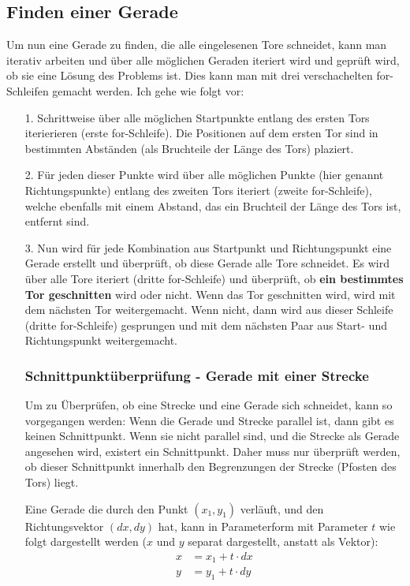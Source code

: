 \documentclass[a4paper,10pt,ngerman]{scrartcl}
\begin{document}
\subsection{Finden einer Gerade}
Um nun eine Gerade zu finden, die alle eingelesenen Tore schneidet, kann man iterativ arbeiten und über alle möglichen Geraden iteriert wird und geprüft wird, ob sie eine Lösung des Problems ist. Dies kann man mit drei verschachelten for-Schleifen gemacht werden.
Ich gehe wie folgt vor:
\begin{itemize}
  \item [1.] Schrittweise über alle möglichen Startpunkte entlang des ersten Tors iterierieren (erste for-Schleife). Die Positionen auf dem ersten Tor sind in bestimmten Abständen (als Bruchteile der Länge des Tors) plaziert.
  \item [2.] Für jeden dieser Punkte wird über alle möglichen Punkte (hier genannt Richtungspunkte) entlang des zweiten Tors iteriert (zweite for-Schleife), welche ebenfalls mit einem Abstand, das ein Bruchteil der Länge des Tors ist, entfernt sind.
  \item [3.] Nun wird für jede Kombination aus Startpunkt und Richtungspunkt eine Gerade erstellt und überprüft, ob diese Gerade alle Tore schneidet. Es wird über alle Tore iteriert (dritte for-Schleife) und überprüft, ob \textbf{ein bestimmtes Tor geschnitten} wird oder nicht.
  Wenn das Tor geschnitten wird, wird mit dem nächsten Tor weitergemacht. Wenn nicht, dann wird aus dieser Schleife (dritte for-Schleife) gesprungen und mit dem nächsten Paar aus Start- und Richtungspunkt weitergemacht.
  \newline
  \subsubsection{Schnittpunktüberprüfung - Gerade mit einer Strecke}

  Um zu Überprüfen, ob eine Strecke und eine Gerade sich schneidet, kann so vorgegangen werden: Wenn die Gerade und Strecke parallel ist, dann gibt es keinen Schnittpunkt. Wenn sie nicht parallel sind, und die Strecke als Gerade angesehen wird, existert ein Schnittpunkt.
  Daher muss nur überprüft werden, ob dieser Schnittpunkt innerhalb den Begrenzungen der Strecke (Pfosten des Tors) liegt.
  \newline 

  Eine Gerade die durch den Punkt $(x_{1}, y_{1})$ verläuft, und den Richtungsvektor $(dx, dy)$ hat, kann in Parameterform mit Parameter $t$ wie folgt dargestellt werden ($x$ und $y$ separat dargestellt, anstatt als Vektor):
  \begin{align}
    x&=x_{1} + t \cdot dx \\
    y&=y_{1} + t \cdot dy
  \end{align}
    

\end{itemize}
\end{document}
